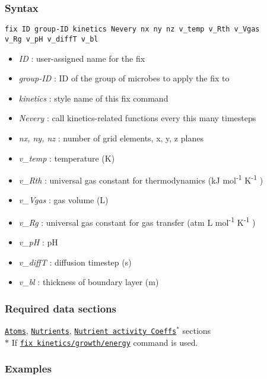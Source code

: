 \documentclass[11pt,a4paper,openright]{article}
\begin{document}
\subsubsection*{Syntax}

\begin{Verbatim}[frame=single]
fix ID group-ID kinetics Nevery nx ny nz v_temp v_Rth v_Vgas 
v_Rg v_pH v_diffT v_bl
\end{Verbatim}
	
\begin{itemize} [nosep]
\item
	{\it ID }: user-assigned name for the fix
\item
	{\it group-ID }: ID of the group of microbes to apply the fix to
\item
	{\it kinetics }: style name of this fix command
\item
	{\it Nevery }: call kinetics-related functions every this many timesteps
\item
	{\it nx, ny, nz }: number of grid elements, x, y, z planes
\item
	{\it v\_temp }: temperature (K)
\item 
	{\it v\_Rth }: universal gas constant for thermodynamics (kJ mol\textsuperscript{-1} K\textsuperscript{-1} )
\item 
	{\it v\_Vgas }: gas volume (L)
\item 
	{\it v\_Rg }: universal gas constant for gas transfer (atm L mol\textsuperscript{-1} K\textsuperscript{-1} )
\item 
	{\it v\_pH }: pH
\item 
	{\it v\_diffT }: diffusion timestep (s)
\item 
	{\it v\_bl }: thickness of boundary layer (m)	 	 	
\end{itemize}

\subsubsection*{Required data sections}
\hyperref[satom]{\tt Atoms}, \hyperref[snutrients]{\tt Nutrients}, \hyperref[sactivitycoeff]{\tt Nutrient activity Coeffs$^*$} sections \\

\noindent $*$ If \hyperref[fkineticsenergy]{\tt fix kinetics/growth/energy} command is used.
\subsubsection*{Examples}
\end{document}
